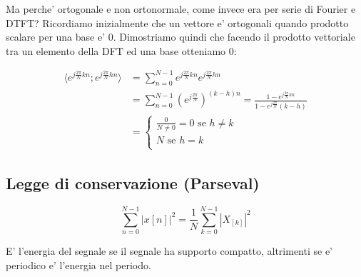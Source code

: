 Ma perche' ortogonale e non ortonormale, come invece era per serie di Fourier e DTFT?
Ricordiamo inizialmente che un vettore e' ortogonali quando prodotto scalare per una base e' 0. Dimostriamo quindi che facendo il prodotto vettoriale tra un elemento della DFT ed una base otteniamo 0:

\[\begin{split}
    \langle e^{j \frac{2\pi}{N}kn}; e^{j \frac{2\pi}{N}hn}\rangle &= \sum_{n=0}^{N-1} e^{j \frac{2\pi}{N}kn} e^{j \frac{2\pi}{N}hn} \\
    &= \sum_{n=0}^{N-1} (e^{j \frac{2\pi}{N}})^{(k-h)n} = \frac{1 - e^{j \frac{2\pi}{N}kn}}{1 - e^{j\frac{2\pi}{N}}(k-h)}\\
    &= 
    \begin{cases}
    \frac{0}{N \neq 0} = 0 \text{ se } h \neq k \\
    N \text{ se } h=k\\
    \end{cases}
\end{split}\]

\subsection{Legge di conservazione (Parseval)}

\begin{equation}
    \sum_{n=0}^{N-1} |x[n]|^2 = \frac{1}{N} \sum_{k=0}^{N-1} |X_{[k]}|^2
\end{equation}

E' l'energia del segnale se il segnale ha supporto compatto, altrimenti se e' periodico e' l'energia nel periodo.